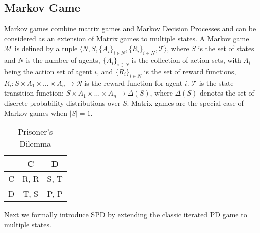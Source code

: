 \documentclass{article}
\begin{document}
\subsection{Markov Game}
Markov games combine matrix games and Markov Decision Processes and can be considered as an extension of Matrix games to multiple states.
A Markov game $\mathcal{M}$ is defined by a tuple $\langle N, S,\{A_i\}_{i \in N},\{R_i\}_{i \in N}, \mathcal{T} \rangle$, where $S$ is the set of states and $N$ is the number of agents, $\{A_i\}_{i\in N}$ is the collection of action sets, with $A_i$ being the action set of agent $i$, and $\{R_i\}_{i\in N}$ is the set of reward functions, $R_i: S \times A_1 \times \ldots \times A_n \rightarrow \mathcal{R}$ is the reward function for agent $i$. $\mathcal{T}$ is the state transition function: $S \times A_1 \times \ldots \times A_n \rightarrow \Delta (S)$, where $\Delta (S)$ denotes the set of discrete probability distributions over $S$. Matrix games are the special case of Markov games when $|S| = 1$.

\begin{table}
\centering
\caption{Prisoner's Dilemma}
\begin{tabular}{|c|c|c|}
\hline
\  & C & D  \\
\hline
C & R, R & S, T \\
\hline
D & T, S & P, P \\
\hline
\end{tabular}
\vspace{-10pt}
\end{table}
\begin{comment}
Matrix games like the prisoner's dilemma only distinguish two atomic actions: cooperate and defect, which ignores several aspects of real-world social dilemmas. First, PD scenarios are usually temporally extended and each cooperate or defect strategy may correspond to a sequence of actions. Second, the concept of cooperation (or defection) may be a graded quantity and a policy can be partially cooperative. To this end, we introduce a Sequential Prisoner's Dilemma (SPD) to better capture the aforementioned characteristics.
\end{comment}

Next we formally introduce SPD by extending the classic iterated PD game to multiple states.
\end{document}
